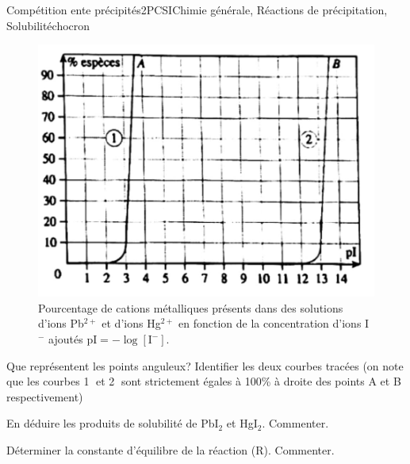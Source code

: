 \begin{exercise}{Compétition ente précipités}{2}{PCSI}{Chimie générale, Réactions de précipitation, Solubilité}{chocron}
\begin{questions}
\begin{EnvUplevel}
\begin{figure}[H]
    \centering
    \includegraphics[width=0.8\linewidth]{chimie/precipitation/precipitationLC.jpg}
    \vspace{-1em}
    \caption[Pourcentage de cations métalliques présents dans des solutions d'ions Pb$^{2+}$ et d'ions Hg$^{2+}$  en fonction de la concentration d'ions I$^-$ ajoutés $\mathrm{pI = -\log [\text{I}^-]}$.]{Pourcentage de cations métalliques présents dans des solutions d'ions Pb$^{2+}$ et d'ions Hg$^{2+}$ en fonction de la concentration d'ions I$^-$ ajoutés $\mathrm{pI = -\log [\text{I}^-]}$.}
\end{figure}
\end{EnvUplevel}

\question Que représentent les points anguleux? Identifier les deux courbes tracées (on note que les courbes \textcircled{1} et \textcircled{2} sont strictement égales à 100\% à droite des points A et B respectivement)

\question  En déduire les produits de solubilité de PbI$_2$ et HgI$_2$. Commenter.

\question Déterminer la constante d'équilibre de la réaction (R). Commenter.

\end{questions}
\end{exercise}

